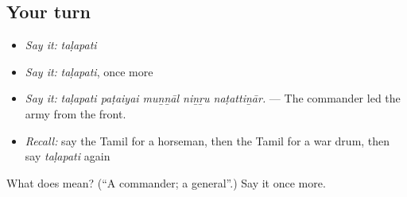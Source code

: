 \subsection*{Your turn}
\begin{itemize}
\raggedright
  \item \emph{Say it:} \emph{taḷapati}
  \item \emph{Say it:} \emph{taḷapati}, once more
  \item \emph{Say it:} \emph{taḷapati paṭaiyai muṉṉāl niṉṟu naṭattiṉār.} — The commander led the army from the front.
  \item \emph{Recall:} say the Tamil for a horseman, then the Tamil for a war drum, then say \emph{taḷapati} again
\end{itemize}

\begin{tcolorbox}[breakable,colback=teal!4,colframe=teal!35!black,title={Before you move on}]
What does  mean? (\textquotedblleft{}A commander; a general\textquotedblright{}.) Say it once more.
\end{tcolorbox}
